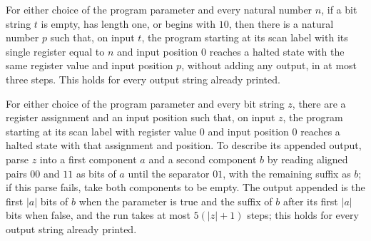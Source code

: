\begin{theorem}
\label{Complexity.PrefixByLength.goes_bad_tail}
\leanok
{}
For either choice of the program parameter and every natural number $n$, if a bit string
$t$ is empty, has length one, or begins with $10$, then there is a natural number $p$
such that, on input $t$, the program starting at its scan label with its single register
equal to $n$ and input position $0$ reaches a halted state with the same register value
and input position $p$, without adding any output, in at most three steps. This holds
for every output string already printed.
\end{theorem}

\begin{theorem}
\label{Complexity.PrefixByLength.goes_total}
\leanok
{}
For either choice of the program parameter and every bit string $z$, there are a
register assignment and an input position such that, on input $z$, the program starting
at its scan label with register value $0$ and input position $0$ reaches a halted state
with that assignment and position. To describe its appended output, parse $z$ into a
first component $a$ and a second component $b$ by reading aligned pairs $00$ and $11$ as
bits of $a$ until the separator $01$, with the remaining suffix as $b$; if this parse
fails, take both components to be empty. The output appended is the first $|a|$ bits of
$b$ when the parameter is true and the suffix of $b$ after its first $|a|$ bits when
false, and the run takes at most $5(|z|+1)$ steps; this holds for every output string
already printed.
\end{theorem}

